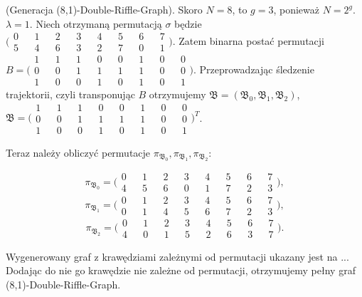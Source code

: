 \begin{example}
	(Generacja (8,1)-Double-Riffle-Graph).
	Skoro $N = 8$, to $g = 3$, ponieważ $N = 2^g$. $\lambda = 1$.
	Niech otrzymaną permutacją $\sigma$ będzie $\bigl( \begin{smallmatrix}
	0 && 1 && 2 && 3 && 4 && 5 && 6 && 7 \\
	5 && 4 && 6 && 3 && 2 && 7 && 0 && 1
	\end{smallmatrix} \bigr) $.
	Zatem binarna postać permutacji $B = \bigl( \begin{smallmatrix}
		1 && 1 && 1 && 0 && 0 && 1 && 0 && 0 \\
		0 && 0 && 1 && 1 && 1 && 1 && 0 && 0 \\
		1 && 0 && 0 && 1 && 0 && 1 && 0 && 1
	\end{smallmatrix} \bigr) $.
	Przeprowadzając śledzenie trajektorii, czyli transponując $B$ otrzymujemy
	$\mathfrak{B} = (\mathfrak{B_0}, \mathfrak{B_1}, \mathfrak{B_2})$, $\mathfrak{B} =\bigl( \begin{smallmatrix}
	1 && 1 && 1 && 0 && 0 && 1 && 0 && 0 \\
	0 && 0 && 1 && 1 && 1 && 1 && 0 && 0 \\
	1 && 0 && 0 && 1 && 0 && 1 && 0 && 1
	\end{smallmatrix} \bigr)^{T} $.
	
	Teraz należy obliczyć permutacje $\pi_{\mathfrak{B_0}},\pi_{\mathfrak{B_1}},\pi_{\mathfrak{B_2}}$:
	
	$$ \pi_{\mathfrak{B_0}}=\bigl( \begin{smallmatrix}
	0 && 1 && 2 && 3 && 4 && 5 && 6 && 7 \\
	4 && 5 && 6 && 0 && 1 && 7 && 2 && 3
	\end{smallmatrix} \bigr), $$
		$$ \pi_{\mathfrak{B_1}}=\bigl( \begin{smallmatrix}
	0 && 1 && 2 && 3 && 4 && 5 && 6 && 7 \\
	0 && 1 && 4 && 5 && 6 && 7 && 2 && 3
	\end{smallmatrix} \bigr), $$
		$$ \pi_{\mathfrak{B_2}}=\bigl( \begin{smallmatrix}
	0 && 1 && 2 && 3 && 4 && 5 && 6 && 7 \\
	4 && 0 && 1 && 5 && 2 && 6 && 3 && 7
	\end{smallmatrix} \bigr). $$
	
	Wygenerowany graf z krawędziami zależnymi od permutacji ukazany jest na ...
	Dodając do nie go krawędzie nie zależne od permutacji, otrzymujemy pełny graf (8,1)-Double-Riffle-Graph.
	
\end{example}


